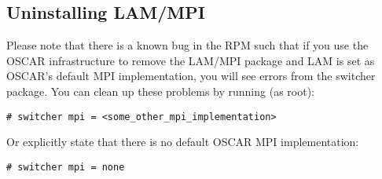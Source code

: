 %
%

\subsection{Uninstalling LAM/MPI}
\label{app:lam-mpi-uninstall}

Please note that there is a known bug in the
 RPM such that if you use the OSCAR
infrastructure to remove the LAM/MPI package and LAM is set as OSCAR's
default MPI implementation, you will see errors from the switcher
package.  You can clean up these problems by running (as root):

\begin{verbatim}
# switcher mpi = <some_other_mpi_implementation>
\end{verbatim}

Or explicitly state that there is no default OSCAR MPI implementation:

\begin{verbatim}
# switcher mpi = none
\end{verbatim}

